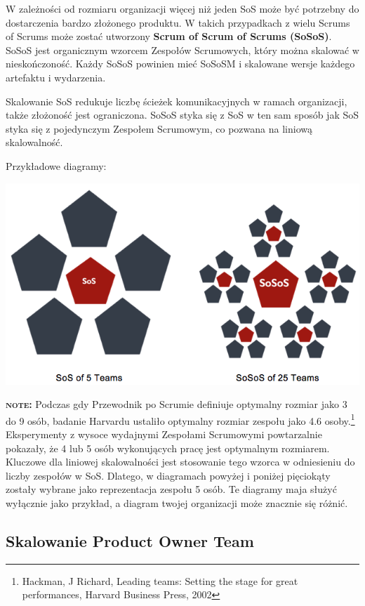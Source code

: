 \documentclass[12pt,a4paper,parskip=full]{scrartcl}
\begin{document}
W zależności od rozmiaru organizacji więcej niż jeden SoS może być potrzebny do dostarczenia bardzo złożonego produktu. W takich przypadkach z wielu  Scrums of Scrums może zostać utworzony \textbf{Scrum of Scrum of Scrums (SoSoS)}. SoSoS jest organicznym wzorcem Zespołów Scrumowych, który można skalować w nieskończoność. Każdy SoSoS powinien mieć SoSoSM i skalowane wersje każdego artefaktu i wydarzenia.

Skalowanie SoS redukuje liczbę ścieżek komunikacyjnych w ramach organizacji, także złożoność jest ograniczona. SoSoS styka się z SoS w ten sam sposób jak SoS styka się z pojedynczym Zespołem Scrumowym, co pozwana na liniową skalowalność.

Przykładowe diagramy:

\includegraphics[width=1.0\linewidth]{Sos-R2.png}

\textbf{\textsc{note:}} Podczas gdy Przewodnik po Scrumie definiuje optymalny rozmiar jako 3 do 9 osób, badanie Harvardu ustaliło optymalny rozmiar zespołu jako 4.6 osoby.\footnote{Hackman, J Richard, Leading teams: Setting the stage for great performances, Harvard Business Press, 2002} Eksperymenty z wysoce wydajnymi Zespołami Scrumowymi powtarzalnie pokazały, że 4 lub 5 osób wykonujących pracę jest optymalnym rozmiarem. Kluczowe dla liniowej skalowalności jest stosowanie tego wzorca w odniesieniu do liczby zespołów w SoS. Dlatego, w diagramach powyżej i poniżej pięciokąty zostały wybrane jako reprezentacja zespołu 5 osób. Te diagramy maja służyć wyłącznie jako przykład, a diagram twojej organizacji może znacznie się różnić.

\subsection{Skalowanie Product Owner Team}
\end{document}
